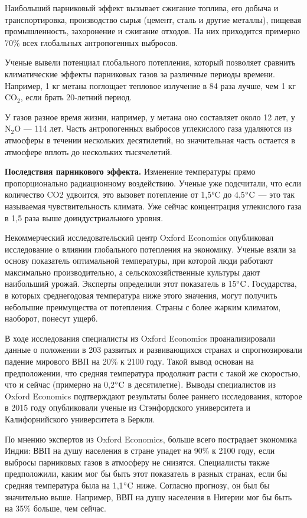 Наибольший парниковый эффект вызывает сжигание топлива, его добыча и транспортировка, производство сырья (цемент, сталь и другие металлы), пищевая промышленность, захоронение и сжигание отходов. На них приходится примерно 70\% всех глобальных антропогенных выбросов.

Ученые вывели потенциал глобального потепления, который позволяет сравнить климатические эффекты парниковых газов за различные периоды времени. Например, 1 кг метана поглощает тепловое излучение в 84 раза лучше, чем 1 кг CO$_2$, если брать 20-летний период.

У газов разное время жизни, например, у метана оно составляет около 12 лет, у N$_2$O — 114 лет. Часть антропогенных выбросов углекислого газа удаляются из атмосферы в течении нескольких десятилетий, но значительная часть остается в атмосфере вплоть до нескольких тысячелетий.

\textbf{Последствия парникового эффекта.}
Изменение температуры прямо пропорционально радиационному воздействию. Ученые уже подсчитали, что если количество CO2 удвоится, это вызовет потепление от 1,5°C до 4,5$^{\circ}\rm{C}$ — это так называемая чувствительность климата. Уже сейчас концентрация углекислого газа в 1,5 раза выше доиндустриального уровня.

Некоммерческий исследовательский центр Oxford Economics опубликовал исследование о влиянии глобального потепления на экономику. Ученые взяли за основу показатель оптимальной температуры, при которой люди работают максимально производительно, а сельскохозяйственные культуры дают наибольший урожай. Эксперты определили этот показатель в 15$^{\circ}\rm{C}$. Государства, в которых среднегодовая температура ниже этого значения, могут получить небольшие преимущества от потепления. Страны с более жарким климатом, наоборот, понесут ущерб.

В ходе исследования специалисты из Oxford Economics проанализировали данные о положении в 203 развитых и развивающихся странах и спрогнозировали падение мирового ВВП на 20\% к 2100 году. Такой вывод основан на предположении, что средняя температура продолжит расти с такой же скоростью, что и сейчас (примерно на 0,2$^{\circ}\rm{C}$ в десятилетие). Выводы специалистов из Oxford Economics подтверждают результаты более раннего исследования, которое в 2015 году опубликовали ученые из Стэнфордского университета и Калифорнийского университета в Беркли.

По мнению экспертов из Oxford Economics, больше всего пострадает экономика Индии: ВВП на душу населения в стране упадет на 90\% к 2100 году, если выбросы парниковых газов в атмосферу не снизятся. Специалисты также предположили, каким мог бы быть этот показатель в разных странах, если бы средняя температура была на 1,1$^{\circ}\rm{C}$ ниже. Согласно прогнозу, он был бы значительно выше. Например, ВВП на душу населения в Нигерии мог бы быть на 35\% больше, чем сейчас.


